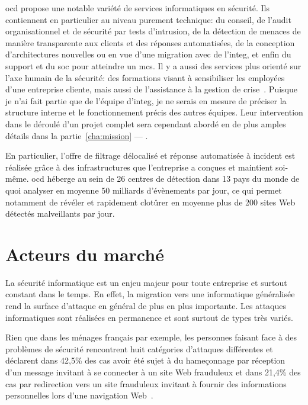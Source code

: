 \documentclass[12pt, oneside, a4paper, titlepage]{report}
\begin{document}
\acrlong{ocd} propose une notable variété de services informatiques en sécurité.
Ils contiennent en particulier au niveau purement technique: du conseil, de
l'audit organisationnel et de sécurité par tests d'intrusion, de la détection de
menaces de manière transparente aux clients et des réponses automatisées, de la
conception d'architectures nouvelles ou en vue d'une migration avec de
l'\gls{integ}, et enfin du support et du \gls{soc} pour atteindre un \gls{mcs}.
Il y a aussi des services plus orienté sur l'axe humain de la sécurité: des
formations visant à sensibiliser les employées d'une entreprise cliente, mais
aussi de l'assistance à la gestion de crise~\cite{ocd}.  Puisque je n'ai fait
partie que de l'équipe d'\gls{integ}, je ne serais en mesure de préciser la
structure interne et le fonctionnement précis des autres équipes. Leur
intervention dans le déroulé d'un projet complet sera cependant abordé en de
plus amples détails dans la partie~\ref{cha:mission} --- .

En particulier, l'offre de filtrage délocalisé et réponse automatisée à incident
est réalisée grâce à des infrastructures que l'entreprise a conçues et maintient
soi-même. \acrlong{ocd} héberge au sein de 26 centres de détection dans 13 pays
du monde de quoi analyser en moyenne 50 milliards d'évènements par jour, ce qui
permet notamment de révéler et rapidement clotûrer en moyenne plus de 200 sites
Web détectés malveillants par jour.

\section{Acteurs du marché}%
\label{sec:intro::acteurs}

La sécurité informatique est un enjeu majeur pour toute entreprise et surtout
constant dans le temps. En effet, la migration vers une informatique généralisée
rend la surface d'attaque en général de plus en plus importante. Les attaques
informatiques sont réalisées en permanence et sont surtout de types très variés.

Rien que dans les ménages français par exemple, les personnes faisant face à des
problèmes de sécurité rencontrent huit catégories d'attaques différentes et
déclarent dans 42,5\% des cas avoir été sujet à du hameçonnage par réception
d'un message invitant à se connecter à un site Web frauduleux et dans 21,4\% des
cas par redirection vers un site frauduleux invitant à fournir des informations
personnelles lors d'une navigation Web~\cite{attack-types}.
\end{document}
